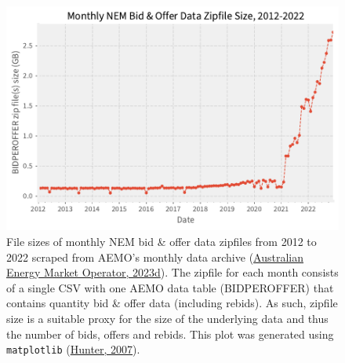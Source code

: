 \documentclass[12pt,a4paper,]{report}
\begin{document}
\begin{figure}
\hypertarget{fig:bid_file_size_2012_2022}{%
\centering
\includegraphics{source/figures/monthly_bidding_data_size_2012_2023.pdf}
\caption{File sizes of monthly NEM bid \& offer data zipfiles from 2012
to 2022 scraped from AEMO's monthly data archive
(\protect\hyperlink{ref-australianenergymarketoperatorElectricityDataModel2023}{Australian
Energy Market Operator, 2023d}). The zipfile for each month consists of
a single CSV with one AEMO data table (BIDPEROFFER) that contains
quantity bid \& offer data (including rebids). As such, zipfile size is
a suitable proxy for the size of the underlying data and thus the number
of bids, offers and rebids. This plot was generated using
\texttt{matplotlib}
(\protect\hyperlink{ref-hunterMatplotlib2DGraphics2007}{Hunter,
2007}).}\label{fig:bid_file_size_2012_2022}
}
\end{figure}
\end{document}
